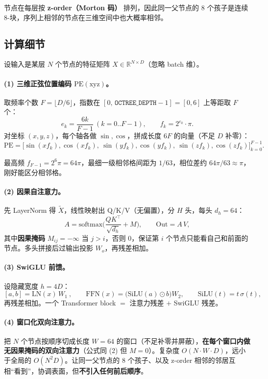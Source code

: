 \documentclass[11pt]{ctexart}
\newcommand{\code}[1]{\texttt{#1}}
\begin{document}
节点在每层按 \textbf{z-order（Morton 码）} 排列，因此同一父节点的 8 个孩子是连续 8-块，序列上相邻的节点在三维空间中也大概率相邻。

\subsection{计算细节}

设输入是某层 $N$ 个节点的特征矩阵 $X\in\mathbb{R}^{N\times D}$（忽略 batch 维）。

\paragraph{(1) 三维正弦位置编码 $\mathrm{PE}(\mathrm{xyz})$。}
取频率个数 $F=\lfloor D/6\rfloor$，指数在 $[0,\,\code{OCTREE\_DEPTH}{-}1]=[0,6]$ 上等距取 $F$ 个：
\[
e_k=\frac{6k}{F-1}\ (k=0..F{-}1),\qquad f_k=2^{e_k}\cdot\pi .
\]
对坐标 $(x,y,z)$，每个轴各做 $\sin,\cos$，拼成长度 $6F$ 的向量（不足 $D$ 补零）：
\[
\mathrm{PE}=\big[\sin(x f_k),\cos(x f_k),\ \sin(y f_k),\cos(y f_k),\ \sin(z f_k),\cos(z f_k)\big]_{k=0}^{F-1}.
\]

最高频 $f_{F-1}=2^6\pi=64\pi$，最细一级相邻格间距为 $1/63$，相位差约 $64\pi/63\approx\pi$，刚好能区分相邻格。

\paragraph{(2) 因果自注意力。}
先 LayerNorm 得 $\tilde X$，线性映射出 Q/K/V（无偏置），分 $H$ 头，每头 $d_h=64$：
\[
A=\mathrm{softmax}\!\Big(\frac{QK^\top}{\sqrt{d_h}}+M\Big),\qquad
\mathrm{Out}=A\,V,
\]
其中\textbf{因果掩码} $M_{ij}=-\infty$ 当 $j>i$，否则 $0$，保证第 $i$ 个节点只能看自己和前面的节点。多头拼接后过输出投影 $W_o$，再残差相加。

\paragraph{(3) SwiGLU 前馈。}
设隐藏宽度 $h=4D$：
\[
[a,b]=\mathrm{LN}(x)\,W_1\ ,\qquad
\mathrm{FFN}(x)=\big(\mathrm{SiLU}(a)\odot b\big)W_2,\qquad \mathrm{SiLU}(t)=t\,\sigma(t),
\]
再残差相加。一个 Transformer block $=$ 注意力残差 $+$ SwiGLU 残差。

\paragraph{(4) 窗口化双向注意力。}
把 $N$ 个节点按顺序切成长度 $W=64$ 的窗口（不足补零并屏蔽），\textbf{在每个窗口内做无因果掩码的双向注意力}（公式同 (2) 但 $M=0$）。复杂度 $O(N\cdot W\cdot D)$，远小于全局的 $O(N^2 D)$。让同一父节点的 8 个孩子、以及 z-order 相邻的邻居互相“看到”，协调表面，但\textbf{不引入任何前后顺序}。
\end{document}
